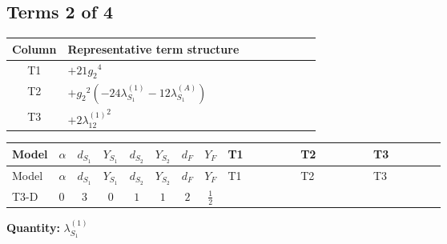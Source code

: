 \documentclass[8pt]{article}
\begin{document}
\begin{landscape}
\subsection*{Terms 2 of 4}
\begin{center}
\begin{tabular}{@{}c >{\raggedright\arraybackslash}p{0.82\linewidth}@{}}
\toprule
Column & Representative term structure \\
\midrule
T1 & \(\displaystyle +21 {g_2}^4\) \\
\midrule
T2 & \(\displaystyle +{g_2}^2 (-24 {\lambda_{S_1}^{(1)}}-12 {\lambda_{S_1}^{(A)}})\) \\
\midrule
T3 & \(\displaystyle +2 {\lambda_{12}^{(1)}}^2\) \\
\midrule
\bottomrule
\end{tabular}
\end{center}
\smallskip
\tiny
\begin{longtable}{@{}llcccccc >{\raggedright\arraybackslash}p{0.21\linewidth} >{\raggedright\arraybackslash}p{0.21\linewidth} >{\raggedright\arraybackslash}p{0.21\linewidth}@{}}
\toprule
Model & $\alpha$ & $d_{S_1}$ & $Y_{S_1}$ & $d_{S_2}$ & $Y_{S_2}$ & $d_F$ & $Y_F$ & T1 & T2 & T3 \\
\midrule
\endfirsthead
\toprule
Model & $\alpha$ & $d_{S_1}$ & $Y_{S_1}$ & $d_{S_2}$ & $Y_{S_2}$ & $d_F$ & $Y_F$ & T1 & T2 & T3 \\
\midrule
\endhead
T3-D & $0$ & $3$ & $0$ & $1$ & $1$ & $2$ & $\frac{1}{2}$ & \scriptsize\adjustbox{max width=\linewidth}{$\begin{gathered} +21 {g_2}^4\end{gathered}$} & \scriptsize\adjustbox{max width=\linewidth}{$\begin{gathered} +{g_2}^2 (-24 {\lambda_{S_1}^{(1)}}-12 {\lambda_{S_1}^{(A)}})\end{gathered}$} & \scriptsize\adjustbox{max width=\linewidth}{$\begin{gathered} +2 {\lambda_{12}^{(1)}}^2\end{gathered}$} \\
\midrule
\bottomrule
\end{longtable}
\clearpage
\noindent\textbf{Quantity: }$\lambda_{S_1}^{(1)}$\par\smallskip

\end{landscape}
\end{document}
